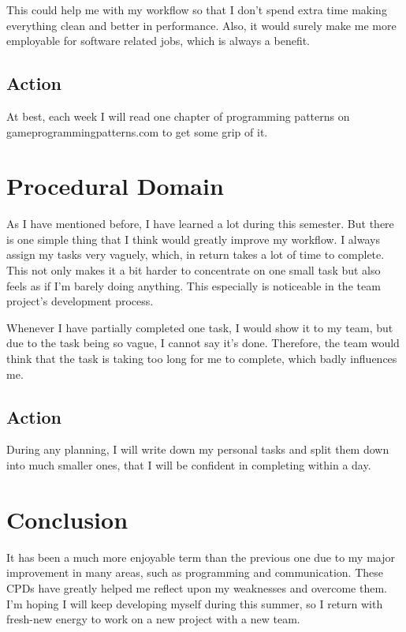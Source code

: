 \documentclass{scrartcl}
\begin{document}
This could help me with my workflow so that I don't spend extra time making everything clean and better in performance. Also, it would surely make me more employable for software related jobs, which is always a benefit.

\subsection{Action}
At best, each week I will read one chapter of programming patterns on gameprogrammingpatterns.com to get some grip of it.

\section{Procedural Domain}
As I have mentioned before, I have learned a lot during this semester. But there is one simple thing that I think would greatly improve my workflow. I always assign my tasks very vaguely, which, in return takes a lot of time to complete. This not only makes it a bit harder to concentrate on one small task but also feels as if I'm barely doing anything. This especially is noticeable in the team project's development process.

Whenever I have partially completed one task, I would show it to my team, but due to the task being so vague, I cannot say it's done. Therefore, the team would think that the task is taking too long for me to complete, which badly influences me.

\subsection{Action}
During any planning, I will write down my personal tasks and split them down into much smaller ones, that I will be confident in completing within a day.

\section{Conclusion}
It has been a much more enjoyable term than the previous one due to my major improvement in many areas, such as programming and communication. These CPDs have greatly helped me reflect upon my weaknesses and overcome them. I'm hoping I will keep developing myself during this summer, so I return with fresh-new energy to work on a new project with a new team.



\end{document}
